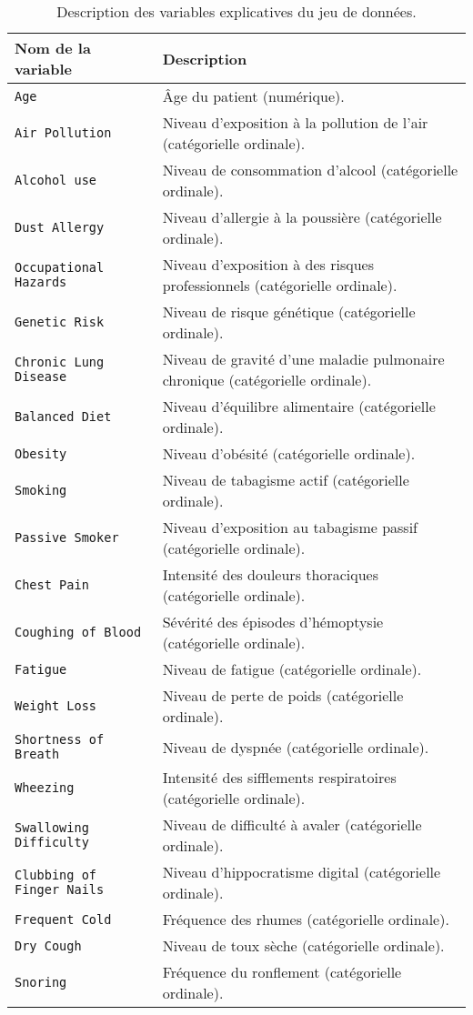 \documentclass[a4paper,11pt]{article}
\begin{document}
\vspace{1em}

\begin{table}[H]
\centering
\small
\renewcommand{\arraystretch}{1.2}
\begin{tabular}{|l|p{10cm}|}
\hline
\textbf{Nom de la variable} & \textbf{Description} \\
\hline
\texttt{Age} & Âge du patient (numérique). \\
\texttt{Air Pollution} & Niveau d'exposition à la pollution de l'air (catégorielle ordinale). \\
\texttt{Alcohol use} & Niveau de consommation d'alcool (catégorielle ordinale). \\
\texttt{Dust Allergy} & Niveau d'allergie à la poussière (catégorielle ordinale). \\
\texttt{Occupational Hazards} & Niveau d'exposition à des risques professionnels (catégorielle ordinale). \\
\texttt{Genetic Risk} & Niveau de risque génétique (catégorielle ordinale). \\
\texttt{Chronic Lung Disease} & Niveau de gravité d'une maladie pulmonaire chronique (catégorielle ordinale). \\
\texttt{Balanced Diet} & Niveau d'équilibre alimentaire (catégorielle ordinale). \\
\texttt{Obesity} & Niveau d'obésité (catégorielle ordinale). \\
\texttt{Smoking} & Niveau de tabagisme actif (catégorielle ordinale). \\
\texttt{Passive Smoker} & Niveau d'exposition au tabagisme passif (catégorielle ordinale). \\
\texttt{Chest Pain} & Intensité des douleurs thoraciques (catégorielle ordinale). \\
\texttt{Coughing of Blood} & Sévérité des épisodes d'hémoptysie (catégorielle ordinale). \\
\texttt{Fatigue} & Niveau de fatigue (catégorielle ordinale). \\
\texttt{Weight Loss} & Niveau de perte de poids (catégorielle ordinale). \\
\texttt{Shortness of Breath} & Niveau de dyspnée (catégorielle ordinale). \\
\texttt{Wheezing} & Intensité des sifflements respiratoires (catégorielle ordinale). \\
\texttt{Swallowing Difficulty} & Niveau de difficulté à avaler (catégorielle ordinale). \\
\texttt{Clubbing of Finger Nails} & Niveau d'hippocratisme digital (catégorielle ordinale). \\
\texttt{Frequent Cold} & Fréquence des rhumes (catégorielle ordinale). \\
\texttt{Dry Cough} & Niveau de toux sèche (catégorielle ordinale). \\
\texttt{Snoring} & Fréquence du ronflement (catégorielle ordinale). \\
\hline
\end{tabular}
\caption{Description des variables explicatives du jeu de données.}
\end{table}
\end{document}
